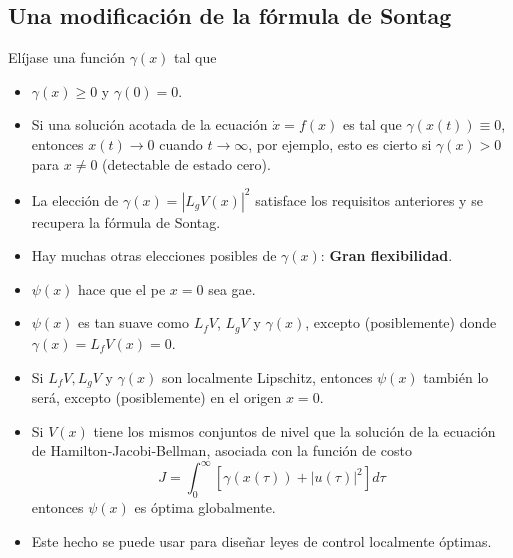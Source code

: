 \subsection{Una modificación de la fórmula de Sontag}
Elíjase una función $\gamma(x)$ tal que
\begin{itemize}
	\item $\gamma(x) \geq 0$ y $\gamma(0) = 0$.
	\item Si una solución acotada de la ecuación $\dot{x} = f(x)$ es tal que $\gamma(x(t)) \equiv 0$, entonces $x(t) \rightarrow 0$ cuando $t \rightarrow \infty$, por ejemplo, esto es cierto si $\gamma(x) > 0$ para $x \neq 0$ (detectable de estado cero).
\end{itemize}

\begin{itemize}
	\item La elección de $\gamma(x) = |L_g V(x)|^2$ satisface los requisitos anteriores y se recupera la fórmula de Sontag.
	\item Hay muchas otras elecciones posibles de $\gamma(x)$: \textbf{Gran flexibilidad}.
\end{itemize}
\begin{itemize}
	\item $\psi(x)$ hace que el \gls{pe} $x=0$ sea \gls{gae}.
	\item $\psi(x)$ es tan suave como $L_f V$, $L_g V$ y $\gamma(x)$, excepto (posiblemente) donde $\gamma(x) = L_f V (x) = 0$.
	\item Si $L_f V, L_g V$ y $\gamma(x)$ son localmente Lipschitz, entonces $\psi(x)$ también lo será, excepto (posiblemente) en el origen $x=0$.
	\item Si $V(x)$ tiene los mismos conjuntos de nivel que la solución de la ecuación de Hamilton-Jacobi-Bellman, asociada con la función de costo
	      \begin{equation*}
		      J = \int_0^\infty [\gamma(x(\tau)) + |u(\tau)|^2] d\tau
	      \end{equation*}
	      entonces $\psi(x)$ es óptima globalmente.
	\item Este hecho se puede usar para diseñar leyes de control localmente óptimas.
\end{itemize}

